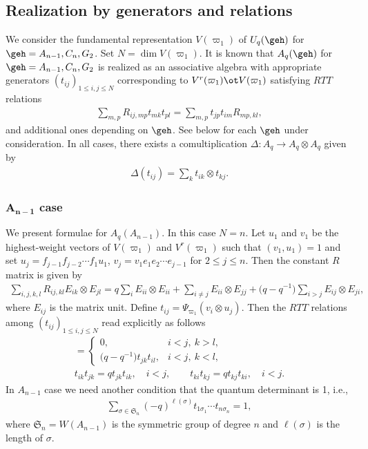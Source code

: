 \subsection{Realization by generators and relations}

We consider the fundamental representation $V(\varpi_1)$ of $U_q(\geh)$ for $\geh=A_{n-1},C_n,G_2$.
Set $N=\dim V(\varpi_1)$. It is known \cite{D86,RTF} that $A_q(\geh)$ for $\geh=A_{n-1},C_n,G_2$ is
realized as an associative algebra with appropriate generators $(t_{ij})_{1\le i,j \le N}$
corresponding to $V^r(\varpi_1)\ot V(\varpi_1)$ satisfying $RTT$ relations
\begin{gather}\label{a:rtt}
 \sum_{m,p}R_{ij,mp}t_{mk}t_{pl}
= \sum_{m,p}t_{jp}t_{im}R_{mp,kl},
\end{gather}
and additional ones depending on $\geh$.
See below for each $\geh$ under consideration.
In all cases, there exists a comultiplication $\Delta: A_q \rightarrow A_q \otimes A_q$ given by
\begin{gather}\label{a:cpro}
\Delta(t_{ij}) = \sum_k t_{ik}\otimes t_{kj}.
\end{gather}

\subsubsection[$A_{n-1}$ case]{$\boldsymbol{A_{n-1}}$ case}\label{a:sss:a1}

We present formulae for $A_q(A_{n-1})$. In this case $N=n$.
Let $u_1$ and $v_1$ be the highest-weight vectors of
$V(\varpi_1)$ and $V^r(\varpi_1)$ such that $(v_1,u_1)=1$ and
set $u_j=f_{j-1}f_{j-2}\cdots f_1u_1$, $v_j=v_1e_1e_2\cdots e_{j-1}$
for $2\le j\le n$. Then the constant $R$ matrix is given by
\begin{gather*}
\sum_{i,j,k,l}R_{ij,kl}E_{ik}\otimes E_{jl}=
q\sum_i E_{ii}\otimes E_{ii} + \sum_{i\neq j}E_{ii}\otimes E_{jj}
+\big(q-q^{-1}\big)\sum_{i>j}E_{ij}\otimes E_{ji},
\end{gather*}
where $E_{ij}$ is the matrix unit. Def\/ine $t_{ij}=\Psi_{\varpi_1}(v_i \otimes u_j)$.
Then the $RTT$ relations among $(t_{ij})_{1\le i,j\le N}$ read explicitly as follows
\begin{gather*}
 [t_{ik}, t_{jl}]=\begin{cases}0, & i<j, \ k>l,\\
\big(q-q^{-1}\big)t_{jk}t_{il}, &  i<j, \ k<l,
\end{cases}\\
 t_{ik}t_{jk} = q t_{jk}t_{ik},\quad i<j,\qquad
t_{ki}t_{kj} = q t_{kj}t_{ki},\quad i<j.
\end{gather*}
In $A_{n-1}$ case we need another condition that the quantum determinant is 1, i.e.,
\begin{gather*}
\sum_{\sigma \in \mathfrak{S}_n}(-q)^{\ell(\sigma)}
t_{1\sigma_1}\cdots t_{n\sigma_n} = 1,
\end{gather*}
where $\mathfrak{S}_n=W(A_{n-1})$ is the symmetric group of degree $n$ and
$\ell(\sigma)$ is the length of $\sigma$.

